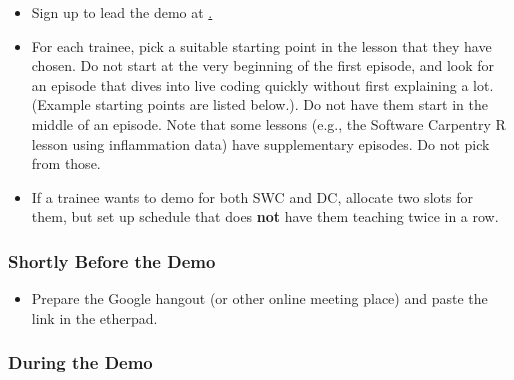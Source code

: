 \begin{itemize}
\itemsep1pt\parskip0pt
\item
  Sign up to lead the demo at
  \href{http://pad.software-carpentry.org/teaching-demos}.
\item
  For each trainee, pick a suitable starting point in the lesson that
  they have chosen. Do not start at the very beginning of the first
  episode, and look for an episode that dives into live coding quickly
  without first explaining a lot. (Example starting points are listed
  below.). Do not have them start in the middle of an episode. Note that
  some lessons (e.g., the Software Carpentry R lesson using inflammation
  data) have supplementary episodes. Do not pick from those.
\item
  If a trainee wants to demo for both SWC and DC, allocate two slots for
  them, but set up schedule that does \textbf{not} have them teaching
  twice in a row.
\end{itemize}

\subsubsection{Shortly Before the Demo}\label{shortly-before-the-demo}

\begin{itemize}
\itemsep1pt\parskip0pt
\item
  Prepare the Google hangout (or other online meeting place) and paste
  the link in the etherpad.
\end{itemize}

\subsubsection{During the Demo}\label{during-the-demo}

